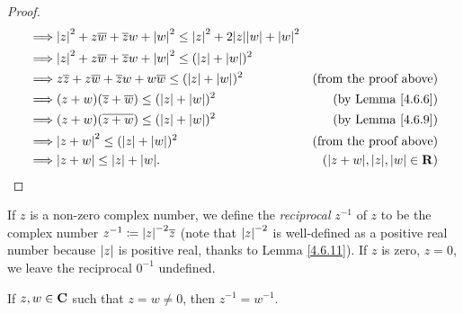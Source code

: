 \begin{proof}
\begin{align*}
        \implies & \abs{z}^2 + z \overline{w} + \overline{z} w + \abs{w}^2 \leq \abs{z}^2 + 2 \abs{z} \abs{w} + \abs{w}^2                                          \\
        \implies & \abs{z}^2 + z \overline{w} + \overline{z} w + \abs{w}^2 \leq (\abs{z} + \abs{w})^2                                                              \\
        \implies & z \overline{z} + z \overline{w} + \overline{z} w + w \overline{w} \leq (\abs{z} + \abs{w})^2           & \text{(from the proof above)}          \\
        \implies & (z + w) (\overline{z} + \overline{w}) \leq (\abs{z} + \abs{w})^2                                       & \text{(by Lemma \ref{4.6.6})}          \\
        \implies & (z + w) (\overline{z + w}) \leq (\abs{z} + \abs{w})^2                                                  & \text{(by Lemma \ref{4.6.9})}          \\
        \implies & \abs{z + w}^2 \leq (\abs{z} + \abs{w})^2                                                               & \text{(from the proof above)}          \\
        \implies & \abs{z + w} \leq \abs{z} + \abs{w}.                                                                    & (\abs{z + w}, \abs{z}, \abs{w} \in \R)
    \end{align*}
\end{proof}

\begin{definition}\label{4.6.12}
    If \(z\) is a non-zero complex number, we define the \emph{reciprocal} \(z^{-1}\) of \(z\) to be the complex number \(z^{-1} \coloneqq \abs{z}^{-2} \overline{z}\)
    (note that \(\left\lvert z\right\rvert^{-2}\) is well-defined as a positive real number because \(\left\lvert z\right\rvert\) is positive real, thanks to Lemma \ref{4.6.11}).
    If \(z\) is zero, \(z = 0\), we leave the reciprocal \(0^{-1}\) undefined.
\end{definition}

\begin{additional corollary}\label{ac 4.6.5}
If \(z, w \in \mathbf{C}\) such that \(z = w \neq 0\), then \(z^{-1} = w^{-1}\).
\end{additional corollary}


